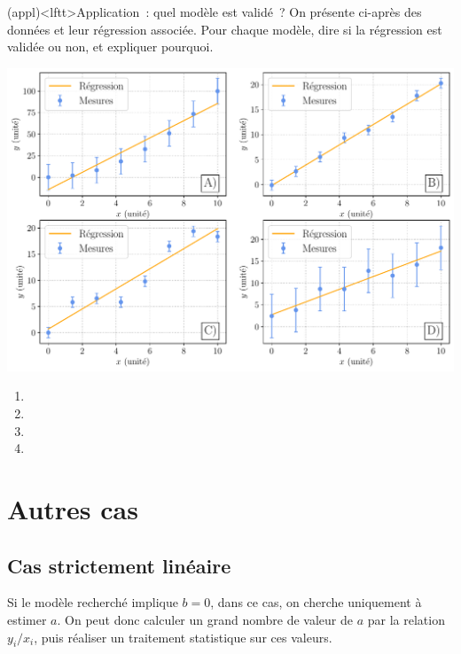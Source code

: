 \documentclass[a4paper, 12pt, garamond]{book}
\begin{document}
\begin{tcn}[breakable](appl)<lftt>{Application~: quel modèle est validé~?}
  On présente ci-après des données et leur régression associée. Pour chaque
  modèle, dire si la régression est validée ou non, et expliquer pourquoi.
  \begin{center}
    \includegraphics[width=\linewidth]{figures/reglin}
    \label{fig:reglin}
  \end{center}
  \tcblower
  \begin{enumerate}[label=\Alph*)]
    \item {}%
    \item {}%
    \item {}%
    \item {}%
  \end{enumerate}
\end{tcn}

\section{Autres cas}
\subsection{Cas strictement linéaire}
Si le modèle recherché implique $b = 0$, dans ce cas, on cherche uniquement à
estimer $a$. On peut donc calculer un grand nombre de valeur de $a$ par la
relation $y_i/x_i$, puis réaliser un traitement statistique sur ces valeurs.
\end{document}
